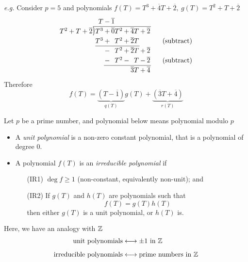 \vspace*{1em}

\emph{e.g.} Consider $p = 5$ and polynomials $f(T) = T^3 + \overline{4}T + \overline{2},\ g(T) = T^2 + T + \overline{2}$
\[
\arraycolsep=1pt
\renewcommand\arraystretch{1.2}
\begin{array}{*1r @{\hskip\arraycolsep}c@{\hskip\arraycolsep} *{11}r}
        &          & T & - & \overline{1}{\color{white}T^1} &  &  &  &\\
\cline{2-9}
T^2 + T + \overline{2} & \longdiv & T^3 & + & \overline{0}T^2 & + & \overline{4}T & + & \overline{2}\\
        &         & T^3 & + & T^2 & + & \overline{2}T&&&&&\quad & \text{(subtract)}\\
\cline{3-7}
        &          &   & - & T^2 & + & \overline{2}T & + & \overline{2} \\
        &          &   & - & T^2 & - & T & - & \overline{2} &&&\quad & \text{(subtract)}\\
\cline{4-9}
        &          &   &   &   &   & \overline{3}T & + &  \overline{4}
\end{array}
\]
Therefore 
\[f(T) = \underbrace{(T-\overline{1})}_{q(T)}g(T) + \underbrace{(\overline{3}T + \overline{4})}_{r(T)}\]

\vspace*{0.5em}

\begin{definition}
Let $p$ be a prime number, and polynomial below means polynomial modulo $p$
\begin{itemize}
\item A \emph{unit polynomial} is a non-zero constant polynomial, that is a polynomial of degree $0$.
\item A polynomial $f(T)$ is an \emph{irreducible polynomial} if
\begin{itemize}
\item[(IR1)] $\deg f \geq 1$ (non-constant, equivalently non-unit); and\label{IR1}
\item[(IR2)] If $g(T)$ and $h(T)$ are polynomials such that \label{IR2}
\[f(T) = g(T)h(T)\]
then either $g(T)$ is a unit polynomial, or $h(T)$ is.
\end{itemize}
\end{itemize}
\end{definition}

\vspace*{2em}

Here, we have an analogy with $\mathbb Z$
\begin{align*}
\text{unit polynomials} &\longleftrightarrow \pm 1 \text{ in } \mathbb Z\\[0.5em]
\text{irreducible polynomials} &\longleftrightarrow \text{prime numbers in } \mathbb Z\\[0.5em]
\end{align*}


